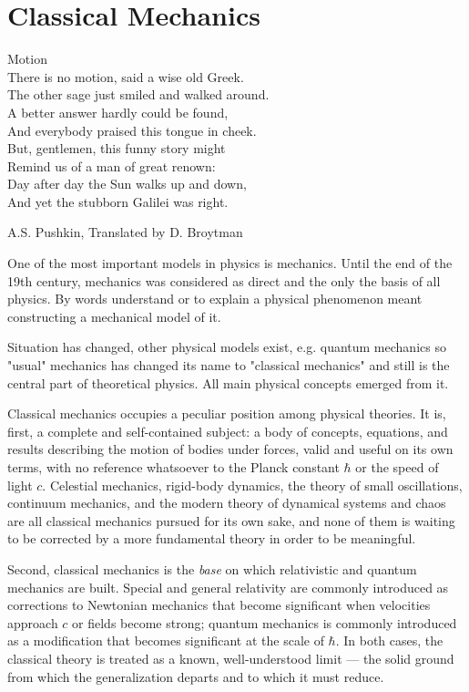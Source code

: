 \chapter{Classical Mechanics}
\label{cm}

{
\setlength{}
\epigraph {
    Motion\\
There is no motion, said a wise old Greek.\\
The other sage just smiled and walked around.\\
A better answer hardly could be found,\\
And everybody praised this tongue in cheek.\\
But, gentlemen, this funny story might\\
Remind us of a man of great renown:\\
Day after day the Sun walks up and down,\\
And yet the stubborn Galilei was right.
} {A.S. Pushkin, Translated by D. Broytman }
}

One of the most important models in physics is mechanics.
Until the end of the 19th century, mechanics was considered as direct and the only
the basis of all physics. By words understand or
to explain a physical phenomenon meant constructing a mechanical model of it.

Situation has changed,  other physical models exist, e.g. quantum mechanics so 
"usual" mechanics has changed its name to "classical mechanics" and still is
the central part of theoretical physics. All main physical concepts emerged from
it.

Classical mechanics occupies a peculiar position among physical theories. It is,
first, a complete and self-contained subject: a body of concepts, equations, and
results describing the motion of bodies under forces, valid and useful on its own
terms, with no reference whatsoever to the Planck constant $\hbar$ or the speed of
light $c$. Celestial mechanics, rigid-body dynamics, the theory of small
oscillations, continuum mechanics, and the modern theory of dynamical systems and
chaos are all classical mechanics pursued for its own sake, and none of them is
waiting to be corrected by a more fundamental theory in order to be meaningful.

Second,  classical mechanics is
the \emph{base} on which relativistic and quantum mechanics are built. Special and
general relativity are commonly introduced as corrections to Newtonian mechanics
that become significant when velocities approach $c$ or fields become strong;
quantum mechanics is commonly introduced as a modification that becomes significant
at the scale of $\hbar$. In both cases, the classical theory is treated as a known,
well-understood limit --- the solid ground from which the generalization departs
and to which it must reduce.

